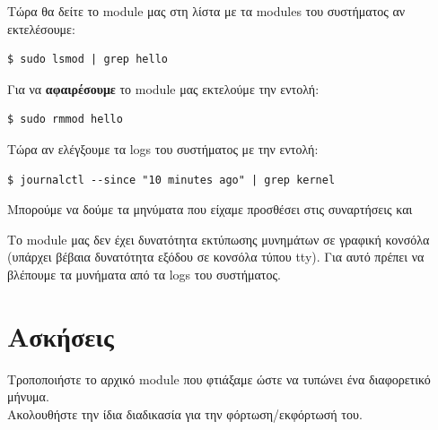 \documentclass[18pt]{extarticle}
\begin{document}
Τώρα θα δείτε το module μας στη λίστα με τα modules του συστήματος αν εκτελέσουμε:

\begin{commandline}
\begin{verbatim}
$ sudo lsmod | grep hello
\end{verbatim}
\end{commandline}

Για να \textbf{αφαιρέσουμε} το module μας εκτελούμε την εντολή:


\begin{commandline}
\begin{verbatim}
$ sudo rmmod hello
\end{verbatim}
\end{commandline}

Τώρα αν ελέγξουμε τα logs του συστήματος με την εντολή: 

\begin{commandline}
\begin{verbatim}
$ journalctl --since "10 minutes ago" | grep kernel
\end{verbatim}
\end{commandline}

Μπορούμε να δούμε τα μηνύματα που είχαμε προσθέσει στις 
συναρτήσεις  και 

Το module μας δεν έχει δυνατότητα εκτύπωσης μυνημάτων σε γραφική κονσόλα (υπάρχει βέβαια δυνατότητα εξόδου σε κονσόλα τύπου tty). 
Για αυτό πρέπει να βλέπουμε τα μυνήματα από τα logs του συστήματος.

\section{Ασκήσεις}

\begin{question}
Τροποποιήστε το αρχικό module που φτιάξαμε ώστε να τυπώνει ένα διαφορετικό μήνυμα. \\
Ακολουθήστε την ίδια διαδικασία για την φόρτωση/εκφόρτωσή του.                                                                                                               

\end{question}
\end{document}
